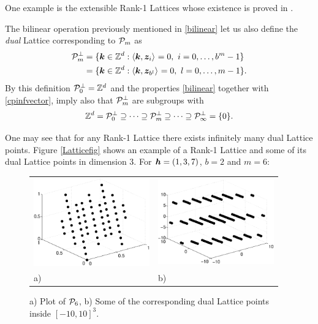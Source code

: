 \documentclass[graybox]{svmult}
\newcommand{\Z}{\mathbb{Z}} %
\newcommand{\N}{\mathbb{N}} %
\newcommand{\F}{\mathbb{F}} %
\newcommand{\bsz}{\boldsymbol{z}}    %
\begin{document}
One example is the extensible Rank-1 Lattices whose existence is proved in \cite{HicNie03a}.

The bilinear operation previously mentioned in \eqref{bilinear} let us also define the \emph{dual} Lattice corresponding to $\mathcal{P}_m$ as
\begin{align}
\nonumber
\cp^{\perp}_m &= \{\bsk \in \Z^d : \ip{\bsk}{\bsz_i} = 0, \ i=0, \ldots, b^m-1\} \\
&= \{\bsk \in \Z^d : \ip{\bsk}{\bsz_{b^{l}}} = 0, \ l=0, \ldots, m-1\}.\label{dualdef}
\end{align}
By this definition $\cp^{\perp}_{0}=\Z^d$ and the properties \eqref{bilinear} together with \eqref{cpinfvector}, imply also that $\mathcal{P}^{\perp}_m$ are subgroups with
\begin{equation}\label{dualemb}
\Z^d=\cp^{\perp}_{0}\supseteq\dots\supseteq\cp^{\perp}_{m}\supseteq\dots\supseteq\cp^{\perp}_{\infty}=\{0\}.
\end{equation}

One may see that for any Rank-1 Lattice there exists infinitely many dual Lattice points. Figure \eqref{Latticefig} shows an example of a Rank-1 Lattice and some of its dual Lattice points in dimension 3. For $\boldsymbol{h}=(1,3,7)$, $b=2$ and $m=6$:
\begin{figure}[h!]
\centering
\begin{tabular}{>{\centering}p{5cm}>{\centering}p{5cm}}
\includegraphics[width=5cm]{Images/Lattice64.eps} &
\includegraphics[width=5cm]{Images/DualLattice64.eps}\tabularnewline
a) & b)
\end{tabular}
\caption{a) Plot of $\mathcal{P}_6$, b) Some of the corresponding dual Lattice points inside $[-10,10]^3$.}\label{Latticefig}
\end{figure}
\end{document}
